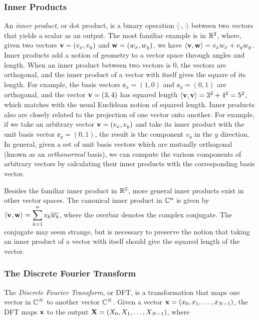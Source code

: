 \subsubsection{Inner Products} \label{sec:innerprod}
An {\em inner product}, or dot product, is a binary operation $\langle \cdot, \cdot \rangle$ between two vectors that yields a scalar as an output. The most familiar example is in $\mathbb{R}^2$, where, given two vectors $\mathbf{v} = (v_x, v_y)$ and $\mathbf{w} = (w_x, w_y)$, we have $\langle \mathbf{v}, \mathbf{w} \rangle = v_x w_x + v_y w_y$. Inner products add a notion of geometry to a vector space through angles and length. When an inner product between two vectors is $0$, the vectors are orthogonal, and the inner product of a vector with itself gives the square of its length. For example, the basis vectors $\ee_x = (1, 0)$ and $\ee_y = (0, 1)$ are orthogonal, and the vector $\mathbf{v} = (3, 4)$ has squared length $\langle \mathbf{v}, \mathbf{v} \rangle = 3^2 + 4^2 = 5^2$, which matches with the usual Euclidean notion of squared length. Inner products also are closely related to the projection of one vector onto another. For example, if we take an arbitrary vector $\mathbf{v} = (v_x, v_y)$ and take its inner product with the unit basis vector $\ee_y = (0, 1)$, the result is the component $v_y$ in the $y$ direction. In general, given a set of unit basis vectors which are mutually orthogonal (known as an {\em orthonormal} basis), we can compute the various components of arbitrary vectors by calculating their inner products with the corresponding basis vector.

Besides the familiar inner product in $\mathbb{R}^2$, more general inner products exist in other vector spaces. The canonical inner product in $\mathbb{C}^n$ is given by $\langle \mathbf{v}, \mathbf{w} \rangle = \displaystyle \sum_{k=1}^{n}v_k\overline{w_k}$, where the overbar denotes the complex conjugate. The conjugate may seem strange, but is necessary to preserve the notion that taking an inner product of a vector with itself should give the squared length of the vector. 

\subsubsection{The Discrete Fourier Transform} \label{sec: DFT}
The {\em Discrete Fourier Transform}, or DFT, is a transformation that maps one vector in $\mathbb{C}^{N}$ to another vector $\mathbb{C}^{N}$. Given a vector $\mathbf{x} = \left(x_0, x_1, \dots, x_{N-1}\right)$, the DFT maps $\mathbf{x}$ to the output $\mathbf{X} = \left(X_0, X_1, \dots, X_{N-1}\right)$, where

